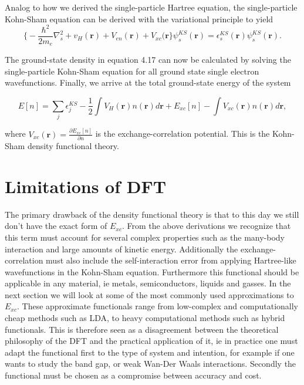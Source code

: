 Analog to how we derived the single-particle Hartree equation, the single-particle Kohn-Sham equation can be derived with the variational principle to yield
\begin{equation}
    \bigg\{ -\frac{\hbar^2}{2m_e}\nabla^2_s + v_H(\boldsymbol{r}) + V_{en}(\boldsymbol{r}) + V_{xc}(\boldsymbol{r} \bigg\}\psi_s^{KS}(\boldsymbol{r}) = \epsilon_s^{KS}(\boldsymbol{r})\psi_s^{KS}(\boldsymbol{r}).
\end{equation}

The ground-state density in equation 4.17 can now be calculated by solving the single-particle Kohn-Sham equation for all ground state single electron wavefunctions. Finally, we arrive at the total ground-state energy of the system

\begin{equation}
E[n] = \sum_j \epsilon_j^{KS} - \frac{1}{2} \int V_H(\boldsymbol{r})n(\boldsymbol{r})d\boldsymbol{r} + E_{xc}[n] - \int V_{xc}(\boldsymbol{r})n(\boldsymbol{r})d\boldsymbol{r}, 
\end{equation}

where $V_{xc}(\boldsymbol{r}) = \frac{\partial E_{xc}[n]}{\partial n}$ is the exchange-correlation potential. This is the Kohn-Sham density functional theory.
 
 

\section{Limitations of DFT}
The primary drawback of the density functional theory is that to this day we still don't have the exact form of $E_{xc}$.  From the above derivations we recognize that this term must account for several complex properties such as the many-body interaction and large amounts of kinetic energy. Additionally the exchange-correlation must also include the self-interaction error from applying Hartree-like wavefunctions in the Kohn-Sham equation. Furthermore this functional should be applicable in any material, ie metals, semiconductors, liquids and gasses. In the next section we will look at some of the most commonly used approximations to $E_{xc}$. These approximate functionals range from low-complex and computationally cheap methods such as LDA, to heavy computational methods such as hybrid functionals. This is therefore seen as a disagreement between the theoretical philosophy of the DFT and the practical application of it, ie in practice one must adapt the functional first to the type of system and intention, for example if one wants to study the band gap, or weak Wan-Der Waals interactions. Secondly the functional must be chosen as a compromise between accuracy and cost.

